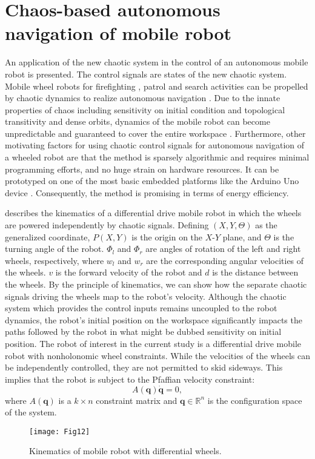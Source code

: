 \documentclass[final,5p,times,twocolumn]{elsarticle}
\begin{document}
\section{Chaos-based autonomous navigation of mobile robot}
An application of the new chaotic system in the control of an autonomous mobile robot is presented. The control signals are states of the new chaotic system. Mobile wheel robots for firefighting \cite{morales2011comparative}, patrol \cite{martins2007patrol} and search activities can be propelled by chaotic dynamics to realize autonomous navigation \cite{moysis2020chaotic,Volos2012a}. Due to the innate properties of chaos including sensitivity on initial condition and topological transitivity and dense orbits, dynamics of the mobile robot can become unpredictable and guaranteed to cover the entire workspace \cite{nakamura2001chaotic,volos2012c}. Furthermore, other motivating factors for using chaotic control signals for autonomous navigation of a wheeled robot are that the method is sparsely algorithmic and requires minimal programming efforts, and no huge strain on hardware resources. It can be prototyped on one of the most basic embedded platforms like the Arduino Uno device \cite{volos2013experimental}. Consequently, the method is promising in terms of energy efficiency. %

 describes the kinematics of a differential drive mobile robot in which the wheels are powered independently by chaotic signals. Defining $(X, Y,\Theta)$ as the generalized coordinate, $P(X, Y)$ is the origin on the $X$-$Y$ plane, and $\Theta$ is the turning angle of the robot. $\Phi_l$ and $\Phi_r$ are angles of rotation of the left and right wheels, respectively, where $w_l$ and $w_r$ are the corresponding angular velocities of the wheels. $v$ is the forward velocity of the robot and $d$ is the distance between the wheels. By the principle of kinematics, we can show how the separate chaotic signals driving the wheels map to the robot's velocity.
Although the chaotic system which provides the control inputs remains uncoupled to the robot dynamics, the robot's initial position on the workspace significantly impacts the paths followed by the robot in what might be dubbed sensitivity on initial position. The robot of interest in the current study is a differential drive mobile robot with nonholonomic wheel constraints. While the velocities of the wheels can be independently controlled, they are not permitted to skid sideways. This implies that the robot is subject to the Pfaffian velocity constraint:
\begin{equation}
A(\bm{q})\dot{\bm{q}}=0,
\end{equation}
where $A(\bm{q})$ is a $k\times n$ constraint matrix and $\bm{q}\in\mathbb{R}^n$ is the configuration space of the system.
\begin{figure}[htbp]
	\texttt{[image: Fig12]}		
	\caption{Kinematics of mobile robot with differential wheels.}
	\label{mobilerobot}
\end{figure} 
\end{document}
